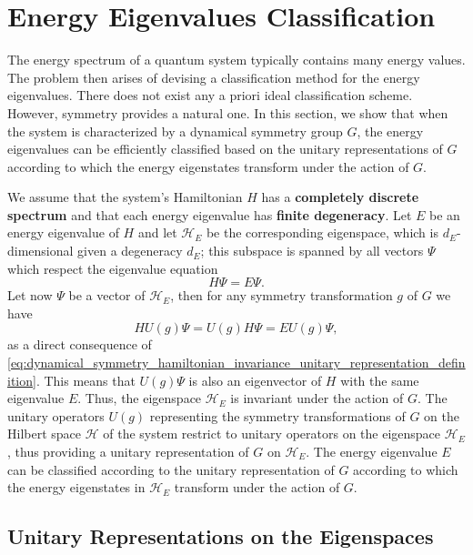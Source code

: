 \section{Energy Eigenvalues Classification}

The energy spectrum of a quantum system typically contains many energy values. The problem then arises of devising a classification method for the energy eigenvalues. There does not exist any a priori ideal classification scheme. However, symmetry provides a natural one. In this section, we show that when the system is characterized by a dynamical symmetry group \(G\), the energy eigenvalues can be efficiently classified based on the unitary representations of \(G\) according to which the energy eigenstates transform under the action of \(G\).

We assume that the system’s Hamiltonian \(H\) has a \textbf{completely discrete spectrum} and that each energy eigenvalue has \textbf{finite degeneracy}. Let \(E\) be an energy eigenvalue of \(H\) and let \(\mathcal{H}_E\) be the corresponding eigenspace, which is \(d_E\)-dimensional given a degeneracy \(d_E\); this subspace is spanned by all vectors \(\Psi\) which respect the eigenvalue equation
\[
    H \Psi = E \Psi.
\]
Let now \(\Psi\) be a vector of \(\mathcal{H}_E\), then for any symmetry transformation \(g\) of \(G\) we have
\[
    H U(g)\Psi = U(g) H \Psi = E U(g) \Psi,
\]
as a direct consequence of \eqref{eq:dynamical_symmetry_hamiltonian_invariance_unitary_representation_definition}. This means that \(U(g)\Psi\) is also an eigenvector of \(H\) with the same eigenvalue \(E\). Thus, the eigenspace \(\mathcal{H}_E\) is invariant under the action of \(G\). The unitary operators \(U(g)\) representing the symmetry transformations of \(G\) on the Hilbert space \(\mathcal{H}\) of the system restrict to unitary operators on the eigenspace \(\mathcal{H}_E\), thus providing a unitary representation of \(G\) on \(\mathcal{H}_E\). The energy eigenvalue \(E\) can be classified according to the unitary representation of \(G\) according to which the energy eigenstates in \(\mathcal{H}_E\) transform under the action of \(G\).

\subsection{Unitary Representations on the Eigenspaces}

